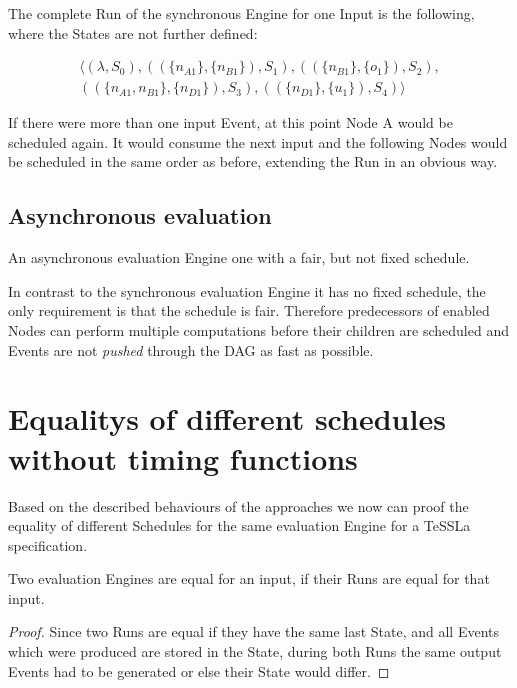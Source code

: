 The complete Run of the synchronous Engine for one Input is the following, where the States are not further defined:

\begin{align*}
  \langle
    (\lambda,                             S_0),
    ((\{ n_{A1}         \}, \{n_{B1}\}),  S_1),
    ((\{ n_{B1}         \}, \{o_1\}),     S_2),\\
    ((\{ n_{A1}, n_{B1} \}, \{n_{D1}\}),  S_3),
    ((\{ n_{D1}         \}, \{u_1\}),     S_4)
  \rangle
\end{align*}

If there were more than one input Event, at this point Node A would be scheduled again.
It would consume the next input and the following Nodes would be scheduled in the same order as before, extending the Run in an obvious way.

\subsection{Asynchronous evaluation}
\label{sec:concepts:behaviour_without_timing:async}

An asynchronous evaluation Engine one with a fair, but not fixed schedule.

In contrast to the synchronous evaluation Engine it has no fixed schedule, the only requirement is that the schedule is fair.
Therefore predecessors of enabled Nodes can perform multiple computations before their children are scheduled and Events are not \emph{pushed} through the DAG as fast as possible.

\section{Equalitys of different schedules without timing functions}
\label{sec:concepts:equalitys_without_timing}

Based on the described behaviours of the approaches we now can proof the equality of different Schedules for the same evaluation Engine for a TeSSLa specification.

\begin{lemma}[name = Equality of Engines for one Input]\label{lemma:eval_equal_if_runs_equal}
  Two evaluation Engines are equal for an input, if their Runs are equal for that input.
\end{lemma}

\begin{proof}
  Since two Runs are equal if they have the same last State, and all Events which were produced are stored in the State, during both Runs the same output Events had to be generated or else their State would differ.
\end{proof}

